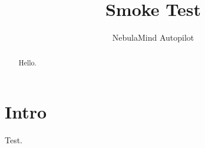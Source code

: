 \documentclass[twocolumn]{aastex631}
\begin{document}
\title{Smoke Test}
\author{NebulaMind Autopilot}
\begin{abstract}Hello.\end{abstract}
\section{Intro}Test.
\end{document}
